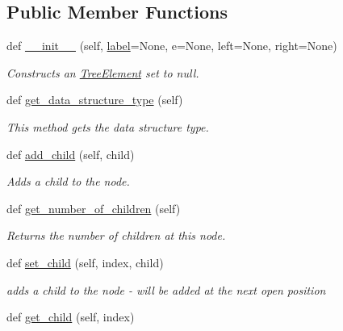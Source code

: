 \subsection*{Public Member Functions}
\begin{DoxyCompactItemize}
\item 
def \mbox{\hyperlink{classbridges_1_1tree__element_1_1_tree_element_aa02dd629714ad2755b2e09123f8fa293}{\+\_\+\+\_\+init\+\_\+\+\_\+}} (self, \mbox{\hyperlink{classbridges_1_1element_1_1_element_a97551dbb005cd5d1f13b65461290c6e3}{label}}=None, e=None, left=None, right=None)
\begin{DoxyCompactList}\small\item\em Constructs an \mbox{\hyperlink{classbridges_1_1tree__element_1_1_tree_element}{Tree\+Element}} set to null. \end{DoxyCompactList}\item 
def \mbox{\hyperlink{classbridges_1_1tree__element_1_1_tree_element_aeefaf309c1271b2e7272cf63be496457}{get\+\_\+data\+\_\+structure\+\_\+type}} (self)
\begin{DoxyCompactList}\small\item\em This method gets the data structure type. \end{DoxyCompactList}\item 
def \mbox{\hyperlink{classbridges_1_1tree__element_1_1_tree_element_a7a5933a3de19a896712389dda41a4452}{add\+\_\+child}} (self, child)
\begin{DoxyCompactList}\small\item\em Adds a child to the node. \end{DoxyCompactList}\item 
def \mbox{\hyperlink{classbridges_1_1tree__element_1_1_tree_element_a5d0c6335324d675a6c0329dad72fca4d}{get\+\_\+number\+\_\+of\+\_\+children}} (self)
\begin{DoxyCompactList}\small\item\em Returns the number of children at this node. \end{DoxyCompactList}\item 
def \mbox{\hyperlink{classbridges_1_1tree__element_1_1_tree_element_aa77f48683b351512dcdf6ec2e90d9a91}{set\+\_\+child}} (self, index, child)
\begin{DoxyCompactList}\small\item\em adds a child to the node -\/ will be added at the next open position \end{DoxyCompactList}\item 
def \mbox{\hyperlink{classbridges_1_1tree__element_1_1_tree_element_ac216f30d22883aa58867de96e03444f1}{get\+\_\+child}} (self, index)

\end{DoxyCompactItemize}
